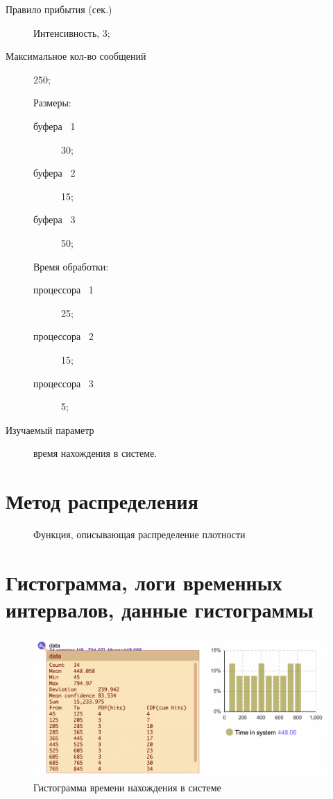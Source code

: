 \documentclass[14pt, a4paper, titlepage]{extarticle}
\begin{document}
	\begin{description}
		\item[Правило прибытия (сек.)] Интенсивность, 3;
		\item[Максимальное кол-во сообщений] 250;
		\item[] Размеры:
		\begin{description}
			\item[буфера \textnumero~1] 30;
			\item[буфера \textnumero~2] 15;
			\item[буфера \textnumero~3] 50;
		\end{description}
		\item[] Время обработки:
		\begin{description}
			\item[процессора \textnumero~1] 25;
			\item[процессора \textnumero~2] 15;
			\item[процессора \textnumero~3] 5;
			
		\end{description}
		\item[Изучаемый параметр] время нахождения в системе.
	\end{description}
	
	\section{Метод распределения}
	
	\begin{figure}[H]
		\centering
		\caption{Функция, описывающая распределение плотности}
	\end{figure}
	
	\section{Гистограмма, логи временных интервалов, данные гистограммы}
	
	\begin{figure}[H]
		\includegraphics[width=.9\textwidth]{hist}
		\caption{Гистограмма времени нахождения  в системе}
	\end{figure}
\end{document}
